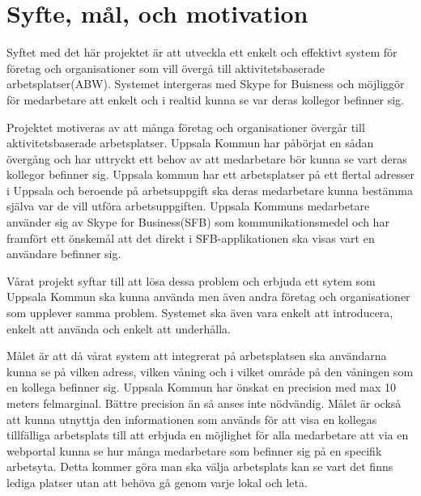\documentclass[a4paper,12pt]{article}
\begin{document}



\section{Syfte, mål, och motivation}
Syftet med det här projektet är att utveckla ett enkelt och effektivt system för företag och organisationer som vill övergå till aktivitetsbaserade arbetsplatser(ABW). Systemet intergeras med Skype for Buisness och möjliggör för medarbetare att enkelt och i realtid kunna se var deras kollegor befinner sig.

Projektet motiveras av att många företag och organisationer övergår till aktivitetsbaserade arbetsplatser. Uppsala Kommun har påbörjat en sådan övergång och har uttryckt ett behov av att medarbetare bör kunna se vart deras kollegor befinner sig. Uppsala kommun har ett arbetsplatser på ett flertal adresser i Uppsala och beroende på arbetsuppgift ska deras medarbetare kunna bestämma själva var de vill utföra arbetsuppgiften. Uppsala Kommuns medarbetare använder sig av Skype for Business(SFB) som kommunikationsmedel och har framfört ett önskemål att det direkt i SFB-applikationen ska visas vart en användare befinner sig.

Vårat projekt syftar till att lösa dessa problem och erbjuda ett sytem som Uppsala Kommun ska kunna använda men även andra företag och organisationer som upplever samma problem. Systemet ska även vara enkelt att introducera, enkelt att använda och enkelt att underhålla.

Målet är att då vårat system att integrerat på arbetsplatsen ska användarna kunna se på vilken adress, vilken våning och i vilket område på den våningen som en kollega befinner sig. Uppsala Kommun har önskat en precision med max 10 meters felmarginal. Bättre precision än så anses inte nödvändig. Målet är också att kunna utnyttja den informationen som används för att visa en kollegas tillfälliga arbetsplats till att erbjuda en möjlighet för alla medarbetare att via en webportal kunna se hur många medarbetare som befinner sig på en specifik arbetsyta. Detta kommer göra man ska välja arbetsplats kan se vart det finns lediga platser utan att behöva gå genom varje lokal och leta.
\end{document}

